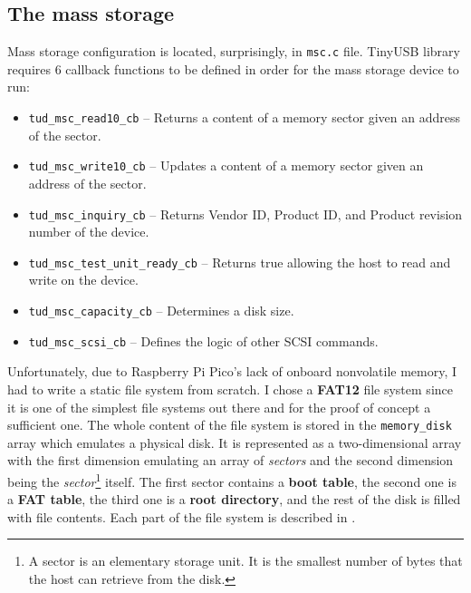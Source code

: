 \subsection{The mass storage}
Mass storage configuration is located, surprisingly, in \verb|msc.c| file. TinyUSB library requires 6 callback functions to be defined in order for the mass storage device to run:
\begin{itemize}
    \item \verb|tud_msc_read10_cb| -- Returns a content of a memory sector given an address of the sector.
    \item \verb|tud_msc_write10_cb| -- Updates a content of a memory sector given an address of the sector.
    \item \verb|tud_msc_inquiry_cb| -- Returns Vendor ID, Product ID, and Product revision number of the device.
    \item \verb|tud_msc_test_unit_ready_cb| -- Returns true allowing the host to read and write on the device.
    \item \verb|tud_msc_capacity_cb| -- Determines a disk size.
    \item \verb|tud_msc_scsi_cb| -- Defines the logic of other SCSI commands.
\end{itemize}
Unfortunately, due to Raspberry Pi Pico's lack of onboard nonvolatile memory, I had to write a static file system from scratch. I chose a \textbf{FAT12} file system since it is one of the simplest file systems out there and for the proof of concept a sufficient one. The whole content of the file system is stored in the \verb|memory_disk| array which emulates a physical disk. It is represented as a two-dimensional array with the first dimension emulating an array of \emph{sectors} and the second dimension being the \emph{sector}\footnote{A sector is an elementary storage unit. It is the smallest number of bytes that the host can retrieve from the disk.} itself. The first sector contains a \textbf{boot table}, the second one is a \textbf{FAT table}, the third one is a \textbf{root directory}, and the rest of the disk is filled with file contents. Each part of the file system is described in \cite{fatFS}.

